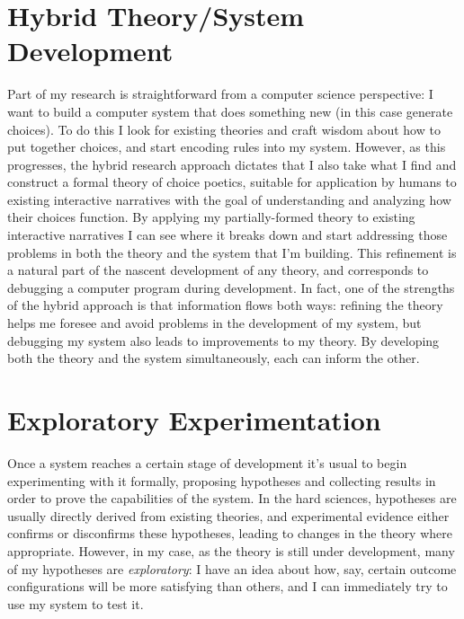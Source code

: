 \section{Hybrid Theory/System Development}

Part of my research is straightforward from a computer science perspective: I want to build a computer system that does something new (in this case generate choices).
%
To do this I look for existing theories and craft wisdom about how to put together choices, and start encoding rules into my system.
%
However, as this progresses, the hybrid research approach dictates that I also take what I find and construct a formal theory of choice poetics, suitable for application by humans to existing interactive narratives with the goal of understanding and analyzing how their choices function.
%
By applying my partially-formed theory to existing interactive narratives I can see where it breaks down and start addressing those problems in both the theory and the system that I'm building.
%
This refinement is a natural part of the nascent development of any theory, and corresponds to debugging a computer program during development.
%
In fact, one of the strengths of the hybrid approach is that information flows both ways: refining the theory helps me foresee and avoid problems in the development of my system, but debugging my system also leads to improvements to my theory.
%
By developing both the theory and the system simultaneously, each can inform the other.


\section{Exploratory Experimentation}

Once a system reaches a certain stage of development it's usual to begin experimenting with it formally, proposing hypotheses and collecting results in order to prove the capabilities of the system.
%
In the hard sciences, hypotheses are usually directly derived from existing theories, and experimental evidence either confirms or disconfirms these hypotheses, leading to changes in the theory where appropriate.
%
However, in my case, as the theory is still under development, many of my hypotheses are \emph{exploratory}: I have an idea about how, say, certain outcome configurations will be more satisfying than others, and I can immediately try to use my system to test it.


